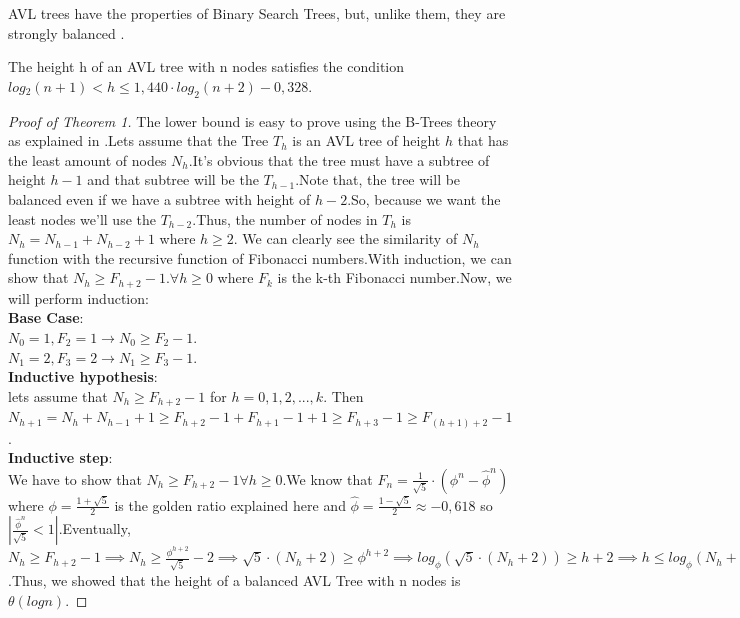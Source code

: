 \documentclass[journal,article,submit,moreauthors,algorithms]{Definitions/mdpi}
\begin{document}
AVL trees have the properties of Binary Search Trees, but, unlike them, they are strongly balanced \cite{tsakalidis}.
\medbreak
\begin{Theorem}
The height h of an AVL tree with n nodes satisfies the condition $log{_2}(n+1) < h \leq 1,440\cdot log_{2}(n+2) - 0,328$.
\end{Theorem}

\begin{proof}[Proof of Theorem 1]
The lower bound is easy to prove using the B-Trees theory as explained in \cite{B-Trees}.Lets assume that the Tree $T_h$ is an AVL tree of height $h$ that has the least amount of nodes $N_h$.It's obvious that the tree must have a subtree of height $h-1$ and that subtree will be the $T_{h-1}$.Note that, the tree will be balanced even if we have a subtree with height of $h-2$.So, because we want the least nodes we'll use the $T_{h-2}$.Thus, the number of nodes in $T_h$ is $N_h = N_{h-1} + N_{h-2} + 1$ where $h \geq 2$. We can clearly see the similarity of $N_h$ function with the recursive function of Fibonacci numbers.With induction, we can show that $N_h \geq F_{h+2} - 1. \forall h \geq 0$ where $F_k$ is the k-th Fibonacci number.Now, we will perform induction:\\
\textbf{Base Case}:\\
$N_0 = 1, F_2 = 1 \rightarrow N_0 \geq F_2 - 1$.\\
$N_1 = 2, F_3 = 2 \rightarrow N_1 \geq F_3 - 1$.\\
\textbf{Inductive hypothesis}:\\
lets assume that $N_h \geq F_{h+2} - 1$ for $h = 0,1,2,...,k$. Then $N_{h+1} = N_h + N_{h-1} + 1 \geq F_{h+2} - 1 + F_{h+1} - 1 + 1 \geq F_{h+3} - 1 \geq F_{(h+1) + 2} - 1$.\\
\textbf{Inductive step}:\\
We have to show that $N_h \geq F_{h+2} - 1 \forall h \geq 0$.We know that $F_n = \frac{1}{\sqrt{5}} \cdot (\phi^n - \hat{\phi}^n)$ where $\phi = \frac{1 + \sqrt{5}}{2}$ is the golden ratio explained here \cite{goldenratio} and $\hat{\phi} = \frac{1 - \sqrt{5}}{2} \approx -0,618$ so $|\frac{\hat{\phi}^n}{\sqrt{5}} < 1|$.Eventually, $N_h \geq F_{h+2} - 1 \implies N_h \geq \frac{\phi^{h+2}}{\sqrt{5}} - 2 \implies \sqrt{5}\cdot (N_h + 2) \geq \phi^{h+2} \implies log_{\phi}(\sqrt{5} \cdot (N_h + 2)) \geq h + 2 \implies h \leq log_{\phi}(N_h + 2) + log_{\phi}(\sqrt{5} - 2) \implies h \lesssim 1,440 \cdot log_2(N_h + 2) - 0.328$.Thus, we showed that the height of a balanced AVL Tree with n nodes is $\theta(logn)$.
\end{proof}
\end{document}
